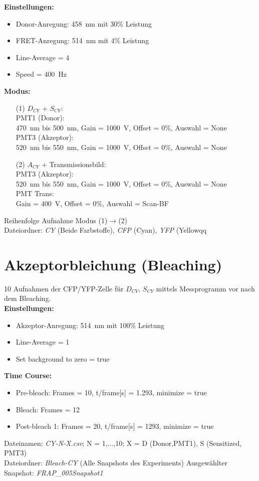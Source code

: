 \textbf{Einstellungen:}
\begin{itemize}
    \item Donor-Anregung: \SI{458}{\nano\metre} mit 30\% Leistung
    \item FRET-Anregung: \SI{514}{\nano\metre} mit 4\% Leistung 
    \item Line-Average = 4
    \item Speed = \SI{400}{\hertz}
\end{itemize}
\textbf{Modus:}
\begin{itemize}
    \item[(1)] $D_{CY}$ + $S_{CY}$:\\
    PMT1 (Donor):\\
    \SI{470}{\nano\metre} bis \SI{500}{\nano\metre}, Gain = \SI{1000}{\volt}, Offset = 0\%, Auswahl = None\\
    PMT3 (Akzeptor):\\
    \SI{520}{\nano\metre} bis \SI{550}{\nano\metre}, Gain = \SI{1000}{\volt}, Offset = 0\%, Auswahl = None
    \item[(2)] $A_{CY}$ + Transmissionsbild:\\
    PMT3 (Akzeptor):\\
     \SI{520}{\nano\metre} bis \SI{550}{\nano\metre}, Gain = \SI{1000}{\volt}, Offset = 0\%, Auswahl = None\\
    PMT Trans:\\
    Gain = \SI{400}{\volt}, Offset = 0\%, Auswahl = Scan-BF\\
\end{itemize} 
Reihenfolge Aufnahme Modus (1)$\rightarrow$(2)\\
Dateiordner: \textit{CY} (Beide Farbstoffe), \textit{CFP} (Cyan), \textit{YFP} (Yellowqq

\section*{Akzeptorbleichung (Bleaching)}
10 Aufnahmen der CFP/YFP-Zelle für $D_{CY}$, $S_{CY}$ mittels Messprogramm vor nach dem Bleaching.\\

\textbf{Einstellungen:}
\begin{itemize}
    \item Akzeptor-Anregung: \SI{514}{\nano\metre} mit 100\% Leistung
    \item Line-Average = 1
    \item Set background to zero = true
\end{itemize}
\textbf{Time Course:}
\begin{itemize}
    \item Pre-bleach: Frames = 10, t/frame[s] = 1.293, minimize = true
    \item Bleach: Frames = 12
    \item Post-bleach 1: Frames = 20, t/frame[s] = 1293, minimize = true
\end{itemize}
Dateinamen: \textit{CY-N-X.csv}; N = 1,...,10; X = D (Donor,PMT1), S (Sensitized, PMT3)\\
Dateiordner: \textit{Bleach-CY} (Alle Snapshots des Experiments) Ausgewählter Snapshot: \textit{FRAP\_005Snapshot1}\\

